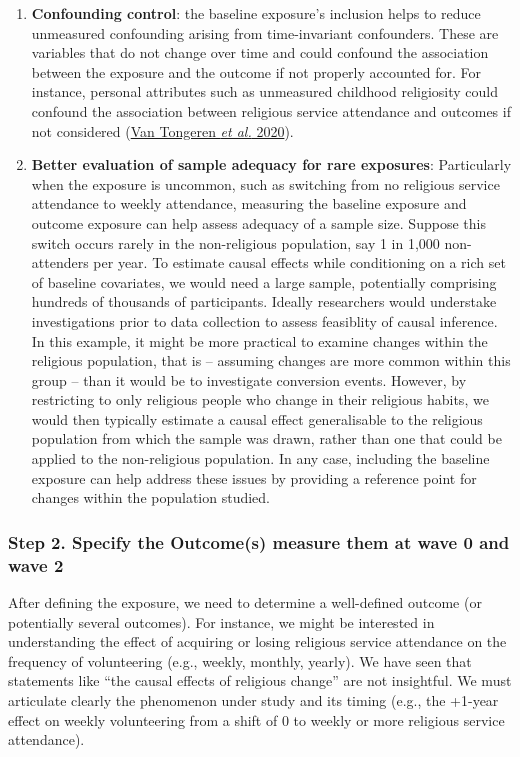\documentclass[
  singlecolumn]{article}
\begin{document}
\begin{enumerate}
\def\labelenumi{\arabic{enumi}.}
\setcounter{enumi}{1}
\item
  \textbf{Confounding control}: the baseline exposure's inclusion helps
  to reduce unmeasured confounding arising from time-invariant
  confounders. These are variables that do not change over time and
  could confound the association between the exposure and the outcome if
  not properly accounted for. For instance, personal attributes such as
  unmeasured childhood religiosity could confound the association
  between religious service attendance and outcomes if not considered
  (\hyperref[ref-vantongeren2020]{Van Tongeren \emph{et al.} 2020}).
\item
  \textbf{Better evaluation of sample adequacy for rare exposures}:
  Particularly when the exposure is uncommon, such as switching from no
  religious service attendance to weekly attendance, measuring the
  baseline exposure and outcome exposure can help assess adequacy of a
  sample size. Suppose this switch occurs rarely in the non-religious
  population, say 1 in 1,000 non-attenders per year. To estimate causal
  effects while conditioning on a rich set of baseline covariates, we
  would need a large sample, potentially comprising hundreds of
  thousands of participants. Ideally researchers would understake
  investigations prior to data collection to assess feasiblity of causal
  inference. In this example, it might be more practical to examine
  changes within the religious population, that is -- assuming changes
  are more common within this group -- than it would be to investigate
  conversion events. However, by restricting to only religious people
  who change in their religious habits, we would then typically estimate
  a causal effect generalisable to the religious population from which
  the sample was drawn, rather than one that could be applied to the
  non-religious population. In any case, including the baseline exposure
  can help address these issues by providing a reference point for
  changes within the population studied.
\end{enumerate}

\subsubsection{Step 2. Specify the Outcome(s) measure them at wave 0 and
wave
2}\label{step-2.-specify-the-outcomes-measure-them-at-wave-0-and-wave-2}

After defining the exposure, we need to determine a well-defined outcome
(or potentially several outcomes). For instance, we might be interested
in understanding the effect of acquiring or losing religious service
attendance on the frequency of volunteering (e.g., weekly, monthly,
yearly). We have seen that statements like ``the causal effects of
religious change'' are not insightful. We must articulate clearly the
phenomenon under study and its timing (e.g., the +1-year effect on
weekly volunteering from a shift of 0 to weekly or more religious
service attendance).
\end{document}
